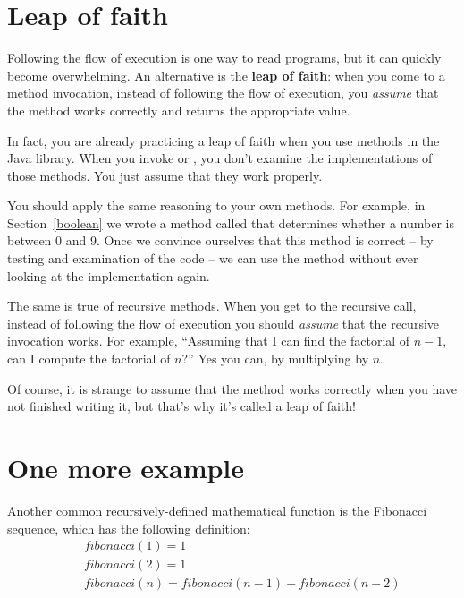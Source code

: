 \section{Leap of faith}
\label{leap of faith}


Following the flow of execution is one way to read programs, but it can quickly become overwhelming.
An alternative is the {\bf leap of faith}:
when you come to a method invocation, instead of following the flow of execution, you {\em assume} that the method works correctly and returns the appropriate value.

In fact, you are already practicing a leap of faith when you use methods in the Java library.
When you invoke  or , you don't examine the implementations of those methods.
You just assume that they work properly.

You should apply the same reasoning to your own methods.
For example, in Section~\ref{boolean} we wrote a method called  that determines whether a number is between 0 and 9.
Once we convince ourselves that this method is correct -- by testing and examination of the code -- we can use the method without ever looking at the implementation again.

The same is true of recursive methods.
When you get to the recursive call, instead of following the flow of execution you should {\em assume} that the recursive invocation works.
For example, ``Assuming that I can find the factorial of $n-1$, can I compute the factorial of $n$?''
Yes you can, by multiplying by $n$.

Of course, it is strange to assume that the method works correctly when you have not finished writing it, but that's why it's called a leap of faith!


\section{One more example}
\label{fibonacci}


Another common recursively-defined mathematical function is the Fibonacci sequence, which has the following definition:
%
\begin{eqnarray*}
&& fibonacci(1) = 1 \\
&& fibonacci(2) = 1 \\
&& fibonacci(n) = fibonacci(n-1) + fibonacci(n-2)
\end{eqnarray*}


